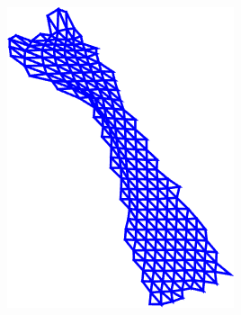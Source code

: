 \begin{figure}[t!]
\begin{subfigure}[b]{0.1\textwidth}
    \end{subfigure}
    \hfill
    \begin{subfigure}[b]{0.1\textwidth}
            \includegraphics[width=\textwidth]{resources/Fig_Flows/4}
    \end{subfigure}
   	\hfill
    \begin{subfigure}[b]{0.1\textwidth}

\end{subfigure}
\end{figure}
